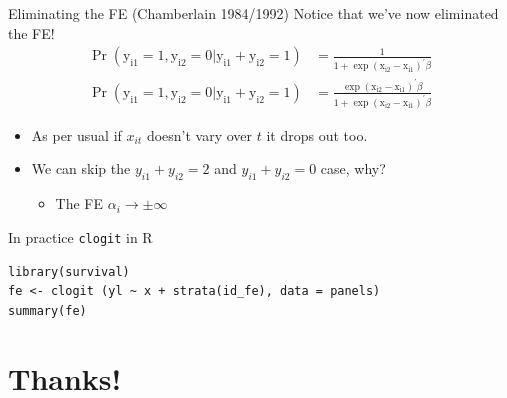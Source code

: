 \documentclass[xcolor=pdftex,dvipsnames,table,mathserif,aspectratio=169]{beamer}
\begin{document}
\begin{frame}{Eliminating the FE (Chamberlain 1984/1992)}
Notice that we've now eliminated the FE!
\begin{align*}
\operatorname{Pr}\left(\mathrm{y}_{\mathrm{i} 1}=1, \mathrm{y}_{\mathrm{i} 2}=0 | \mathrm{y}_{\mathrm{i} 1}+\mathrm{y}_{\mathrm{i} 2}=1\right)&=
\frac{1}{1+\exp \left(\mathrm{x}_{\mathrm{i} 2}-\mathrm{x}_{\mathrm{i} 1}\right)^{\prime} \beta}\\
\operatorname{Pr}\left(\mathrm{y}_{\mathrm{i} 1}=1, \mathrm{y}_{\mathrm{i} 2}=0 | \mathrm{y}_{\mathrm{i} 1}+\mathrm{y}_{\mathrm{i} 2}=1\right)&=
\frac{\exp \left(\mathrm{x}_{\mathrm{i} 2}-\mathrm{x}_{\mathrm{i} 1}\right)^{\prime} \beta}{1+\exp \left(\mathrm{x}_{\mathrm{i} 2}-\mathrm{x}_{\mathrm{i} 1}\right)^{\prime} \beta}
\end{align*}
\begin{itemize}
\item As per usual if $x_{it}$ doesn't vary over $t$ it drops out too.
\item We can skip the $y_{i1} + y_{i2}=2$ and $y_{i1} + y_{i2}=0$ case, why?
\begin{itemize}
\item The FE $\alpha_i \rightarrow \pm \infty$
\end{itemize}
\end{itemize}
\end{frame}


\begin{frame}[fragile]{In practice \texttt{clogit} in R }
\begin{verbatim}
library(survival)
fe <- clogit (yl ~ x + strata(id_fe), data = panels)
summary(fe)

\end{verbatim}
\end{frame}
\section*{Thanks!}
\end{document}
